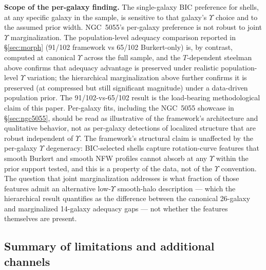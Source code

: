 \documentclass[linenumbers]{aastex701}
\newcommand{\Yt}{\Upsilon}
\begin{document}
\textbf{Scope of the per-galaxy finding.} The single-galaxy BIC preference for shells, at any specific galaxy in the sample, is sensitive to that galaxy's $\Yt$ choice and to the assumed prior width. NGC~5055's per-galaxy preference is not robust to joint $\Yt$ marginalization. The population-level adequacy comparison reported in \S\ref{sec:morph} (91/102 framework vs 65/102 Burkert-only) is, by contrast, computed at canonical $\Yt$ across the full sample, and the $T$-dependent steelman above confirms that adequacy advantage is preserved under realistic population-level $\Yt$ variation; the hierarchical marginalization above further confirms it is preserved (at compressed but still significant magnitude) under a data-driven population prior. The 91/102-vs-65/102 result is the load-bearing methodological claim of this paper. Per-galaxy fits, including the NGC~5055 showcase in \S\ref{sec:ngc5055}, should be read as illustrative of the framework's architecture and qualitative behavior, not as per-galaxy detections of localized structure that are robust independent of $\Yt$. The framework's structural claim is unaffected by the per-galaxy $\Yt$ degeneracy: BIC-selected shells capture rotation-curve features that smooth Burkert and smooth NFW profiles cannot absorb at any $\Yt$ within the prior support tested, and this is a property of the data, not of the $\Yt$ convention. The question that joint marginalization addresses is what fraction of those features admit an alternative low-$\Yt$ smooth-halo description --- which the hierarchical result quantifies as the difference between the canonical 26-galaxy and marginalized 14-galaxy adequacy gaps --- not whether the features themselves are present.

\subsection{Summary of limitations and additional channels}\label{sec:limsummary}
\end{document}

